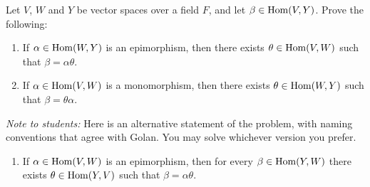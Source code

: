 \probskip



\begin{problem}[Golan 293 \& 294]
Let $V$, $W$ and $Y$ be vector spaces over a field $F$, and
let $\beta \in \operatorname{Hom}(V,Y)$. Prove the following:
\begin{enumerate}
\item  If $\alpha \in \operatorname{Hom}(W, Y)$ is an epimorphism, then 
there exists $\theta \in \operatorname{Hom}(V,W)$ such that $\beta = \alpha \theta$.

\begin{center}
\end{center}

\item  If $\alpha \in \operatorname{Hom}(V, W)$ is a monomorphism, then 
there exists $\theta \in \operatorname{Hom}(W,Y)$ such that $\beta = \theta \alpha$.

\begin{center}
\end{center}

\end{enumerate}

\noindent \emph{Note to students:} Here is an alternative statement of the problem, with
naming conventions that agree with Golan. You may solve whichever version you prefer. 

\begin{enumerate}
\item  
If $\alpha \in \operatorname{Hom}(V,W)$ is an epimorphism, then for every 
$\beta \in \operatorname{Hom}(Y,W)$ there exists $\theta \in \operatorname{Hom}(Y,V)$ such that $\beta = \alpha \theta$.

\begin{center}
\end{center}


\end{enumerate}
\end{problem}
